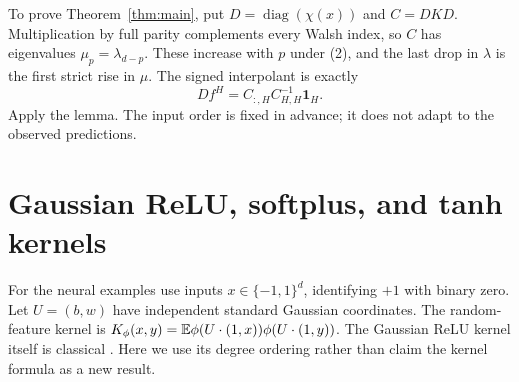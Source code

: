 \documentclass[11pt]{article}
\newcommand{\one}{\mathbf1}
\begin{document}
To prove Theorem~\ref{thm:main}, put
$D=\operatorname{diag}(\chi(x))$ and $C=DKD$.
Multiplication by full parity complements every Walsh index, so
$C$ has eigenvalues $\mu_p=\lambda_{d-p}$.
These increase with $p$ under (2), and the last drop in $\lambda$
is the first strict rise in $\mu$. The signed interpolant is exactly
\[
                  Df^H=C_{:,H}C_{H,H}^{-1}\one_H.
\]
Apply the lemma. The input order is fixed in advance; it does not
adapt to the observed predictions.

\section{Gaussian ReLU, softplus, and tanh kernels}
For the neural examples use inputs $x\in\{-1,1\}^d$, identifying
$+1$ with binary zero. Let $U=(b,w)$ have independent standard Gaussian
coordinates. The random-feature kernel is
$K_\phi(x,y)=\mathbb E\phi(U\cdot(1,x))\phi(U\cdot(1,y))$.
The Gaussian ReLU kernel itself is classical \cite{cho}.
Here we use its degree ordering rather than claim the kernel formula
as a new result.
\end{document}
